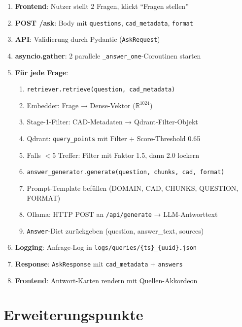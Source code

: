 \documentclass[12pt, a4paper]{article}
\begin{document}
\begin{enumerate}[leftmargin=1.5cm, label=\textbf{Schritt \arabic*.}]
  \item \textbf{Frontend}: Nutzer stellt 2 Fragen, klickt ``Fragen stellen''
  \item \textbf{POST /ask}: Body mit \texttt{questions}, \texttt{cad\_metadata}, \texttt{format}
  \item \textbf{API}: Validierung durch Pydantic (\texttt{AskRequest})
  \item \textbf{asyncio.gather}: 2 parallele \texttt{\_answer\_one}-Coroutinen starten
  \item \textbf{Für jede Frage}:
    \begin{enumerate}[label=\alph*)]
      \item \texttt{retriever.retrieve(question, cad\_metadata)}
      \item Embedder: Frage → Dense-Vektor ($\mathbb{R}^{1024}$)
      \item Stage-1-Filter: CAD-Metadaten → Qdrant-Filter-Objekt
      \item Qdrant: \texttt{query\_points} mit Filter + Score-Threshold 0.65
      \item Falls $< 5$ Treffer: Filter mit Faktor 1.5, dann 2.0 lockern
      \item \texttt{answer\_generator.generate(question, chunks, cad, format)}
      \item Prompt-Template befüllen (DOMAIN, CAD, CHUNKS, QUESTION, FORMAT)
      \item Ollama: HTTP POST an \texttt{/api/generate} → LLM-Antworttext
      \item \texttt{Answer}-Dict zurückgeben (question, answer\_text, sources)
    \end{enumerate}
  \item \textbf{Logging}: Anfrage-Log in \texttt{logs/queries/\{ts\}\_\{uuid\}.json}
  \item \textbf{Response}: \texttt{AskResponse} mit \texttt{cad\_metadata} + \texttt{answers}
  \item \textbf{Frontend}: Antwort-Karten rendern mit Quellen-Akkordeon
\end{enumerate}

\section{Erweiterungspunkte}
\end{document}
